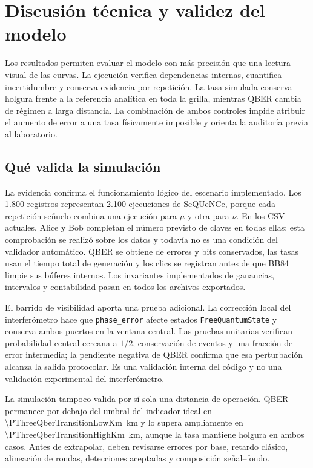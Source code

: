 \chapter{Discusión técnica y validez del modelo}
\label{chap:discusion}

Los resultados permiten evaluar el modelo con más precisión que una lectura visual de las curvas. La ejecución verifica dependencias internas, cuantifica incertidumbre y conserva evidencia por repetición. La tasa simulada conserva holgura frente a la referencia analítica en toda la grilla, mientras QBER cambia de régimen a larga distancia. La combinación de ambos controles impide atribuir el aumento de error a una tasa físicamente imposible y orienta la auditoría previa al laboratorio.

\section{Qué valida la simulación}

La evidencia confirma el funcionamiento lógico del escenario implementado. Los 1.800 registros representan 2.100 ejecuciones de SeQUeNCe, porque cada repetición señuelo combina una ejecución para \(\mu\) y otra para \(\nu\). En los CSV actuales, Alice y Bob completan el número previsto de claves en todas ellas; esta comprobación se realizó sobre los datos y todavía no es una condición del validador automático. QBER se obtiene de errores y bits conservados, las tasas usan el tiempo total de generación y los clics se registran antes de que BB84 limpie sus búferes internos. Los invariantes implementados de ganancias, intervalos y contabilidad pasan en todos los archivos exportados.

El barrido de visibilidad aporta una prueba adicional. La corrección local del interferómetro hace que \texttt{phase\_error} afecte estados \texttt{FreeQuantumState} y conserva ambos puertos en la ventana central. Las pruebas unitarias verifican probabilidad central cercana a \(1/2\), conservación de eventos y una fracción de error intermedia; la pendiente negativa de QBER confirma que esa perturbación alcanza la salida protocolar. Es una validación interna del código y no una validación experimental del interferómetro.

La simulación tampoco valida por sí sola una distancia de operación. QBER permanece por debajo del umbral del indicador ideal en \SI[round-mode=places,round-precision=2]{\PThreeQberTransitionLowKm}{\kilo\meter} y lo supera ampliamente en \SI[round-mode=places,round-precision=2]{\PThreeQberTransitionHighKm}{\kilo\meter}, aunque la tasa mantiene holgura en ambos casos. Antes de extrapolar, deben revisarse errores por base, retardo clásico, alineación de rondas, detecciones aceptadas y composición señal--fondo.

